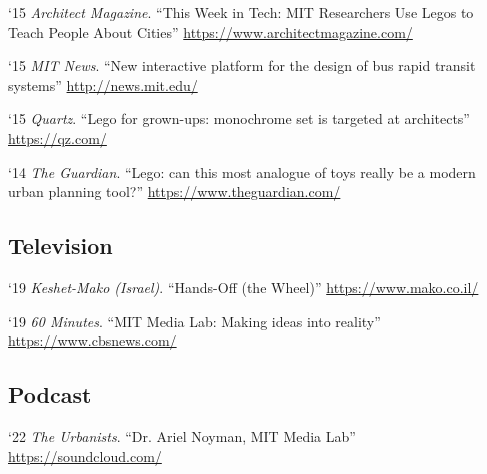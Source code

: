 \begin{tablist}
    \item[`15] \tab \textit{Architect Magazine}. \enquote{This Week in Tech: MIT Researchers Use Legos to Teach People About Cities}
    \href{https://www.architectmagazine.com/technology/this-week-in-tech-mit-researchers-use-legos-to-teach-people-about-cities_o}{https://www.architectmagazine.com/}

    \item[`15] \tab \textit{MIT News}. \enquote{New interactive platform for the design of bus rapid transit systems}
    \href{http://news.mit.edu/2015/interactive-platform-design-bus-rapid-transit-brt-systems-1007}{http://news.mit.edu/}

    \item[`15] \tab \textit{Quartz}. \enquote{Lego for grown-ups: monochrome set is targeted at architects}
    \href{https://qz.com/315776/lego-for-grown-ups-the-toy-maker-is-targeting-architects-and-urban-planners/}{https://qz.com/}

    \item[`14] \tab \textit{The Guardian}. \enquote{Lego: can this most analogue of toys really be a modern urban planning tool?}
    \href{https://www.theguardian.com/cities/2014/dec/18/lego-toys-urban-planning-tool-architects-mit}{https://www.theguardian.com/}

    \subsection*{Television}
    \item[`19] \tab \textit{Keshet-Mako (Israel)}. \enquote{Hands-Off (the Wheel)}
    \href{https://www.mako.co.il/nexter-weekend/Article-29c0ce116238d51006.htm}{https://www.mako.co.il/}

    \item[`19] \tab \textit{60 Minutes}. \enquote{MIT Media Lab: Making ideas into reality}
    \href{https://www.cbsnews.com/news/60-minutes-mit-media-lab-making-ideas-into-reality-future-factory-2019-08-04/}{https://www.cbsnews.com/}

    \subsection*{Podcast}

    \item[`22] \tab \textit{The Urbanists}. \enquote{Dr. Ariel Noyman, MIT Media Lab}
    \href{https://soundcloud.com/omer-raz/40a}{https://soundcloud.com/}
    

\end{tablist}
